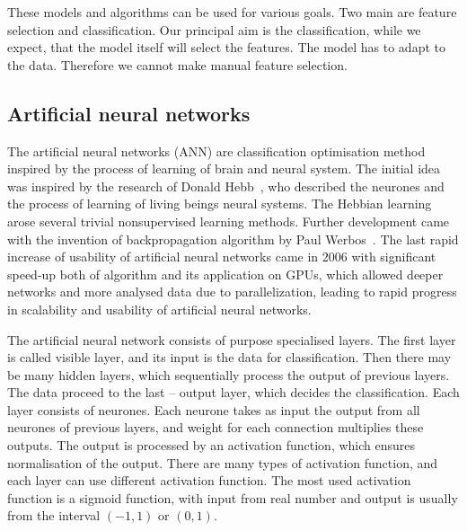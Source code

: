 \documentclass[
  print, %
  Table,   %
  nolof,     %
  nolot,     %
  11pt, %
  oneside  %
]{fithesis3}
\begin{document}
These models and algorithms can be used for various goals. Two main are feature selection and classification. Our principal aim is the classification, while we expect, that the model itself will select the features. The model has to adapt to the data. Therefore we cannot make manual feature selection.


\subsection{Artificial neural networks}
\label{subsec:opt-other-ann}

The artificial neural networks (ANN) are classification optimisation method inspired by the process of learning of brain and neural system. The initial idea was inspired by the research of Donald Hebb~\cite{hebb49learning}, who described the neurones and the process of learning of living beings neural systems. The Hebbian learning arose several trivial nonsupervised learning methods. Further development came with the invention of backpropagation algorithm by Paul Werbos~\cite{werbos75beyondThesis}. The last rapid increase of usability of artificial neural networks came in 2006 with significant speed-up both of algorithm and its application on GPUs, which allowed deeper networks and more analysed data due to parallelization, leading to rapid progress in scalability and usability of artificial neural networks.

The artificial neural network consists of purpose specialised layers. The first layer is called visible layer, and its input is the data for classification. Then there may be many hidden layers, which sequentially process the output of previous layers. The data proceed to the last -- output layer, which decides the classification. Each layer consists of neurones. Each neurone takes as input the output from all neurones of previous layers, and weight for each connection multiplies these outputs. The output is processed by an activation function, which ensures normalisation of the output. There are many types of activation function, and each layer can use different activation function. The most used activation function is a sigmoid function, with input from real number and output is usually from the interval $(-1, 1)$ or $(0, 1)$.
\end{document}
